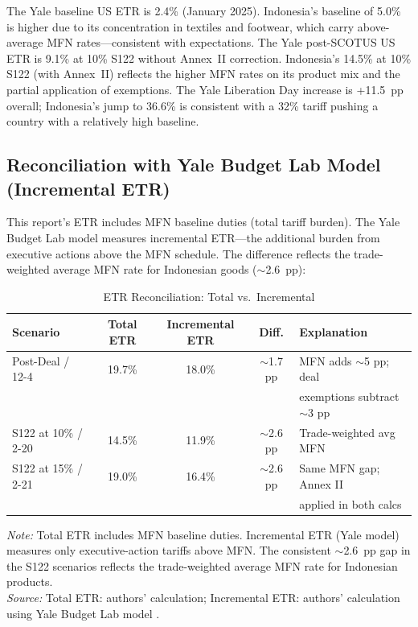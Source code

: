 \documentclass[12pt,a4paper]{article}
\begin{document}
The Yale baseline US ETR is 2.4\% (January 2025). Indonesia's baseline of 5.0\% is higher due to its concentration in textiles and footwear, which carry above-average MFN rates---consistent with expectations. The Yale post-SCOTUS US ETR is 9.1\% at 10\% S122 without Annex~II correction. Indonesia's 14.5\% at 10\% S122 (with Annex~II) reflects the higher MFN rates on its product mix and the partial application of exemptions. The Yale Liberation Day increase is +11.5~pp overall; Indonesia's jump to 36.6\% is consistent with a 32\% tariff pushing a country with a relatively high baseline.

\subsection*{Reconciliation with Yale Budget Lab Model (Incremental ETR)}

This report's ETR includes MFN baseline duties (total tariff burden). The Yale Budget Lab model measures incremental ETR---the additional burden from executive actions above the MFN schedule. The difference reflects the trade-weighted average MFN rate for Indonesian goods ($\sim$2.6~pp):

\begin{table}[htbp]
\centering
\caption{ETR Reconciliation: Total vs.\ Incremental}
\begin{tabular}{lcccl}
\toprule
\textbf{Scenario} & \textbf{Total ETR} & \textbf{Incremental ETR} & \textbf{Diff.} & \textbf{Explanation} \\
\midrule
Post-Deal / 12-4 & 19.7\% & 18.0\% & $\sim$1.7 pp & MFN adds $\sim$5 pp; deal \\
& & & & exemptions subtract $\sim$3 pp \\
S122 at 10\% / 2-20 & 14.5\% & 11.9\% & $\sim$2.6 pp & Trade-weighted avg MFN \\
S122 at 15\% / 2-21 & 19.0\% & 16.4\% & $\sim$2.6 pp & Same MFN gap; Annex II \\
& & & & applied in both calcs \\
\bottomrule
\end{tabular}
\par\smallskip
\begin{minipage}{\linewidth}
\footnotesize
\textit{Note:} Total ETR includes MFN baseline duties. Incremental ETR (Yale model) measures only executive-action tariffs above MFN. The consistent $\sim$2.6~pp gap in the S122 scenarios reflects the trade-weighted average MFN rate for Indonesian products.\\
\textit{Source:} Total ETR: authors' calculation; Incremental ETR: authors' calculation using Yale Budget Lab model \cite{yalebudgetlab_model}.
\end{minipage}
\end{table}
\end{document}
